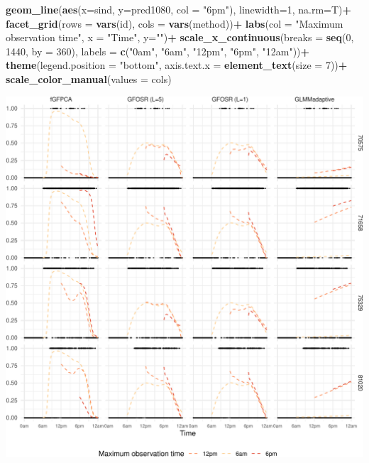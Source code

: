 \documentclass[
]{article}
\newenvironment{Shaded}{\begin{snugshade}}{\end{snugshade}}
\newcommand{\AttributeTok}[1]{\textcolor[rgb]{0.13,0.29,0.53}{#1}}
\newcommand{\DecValTok}[1]{\textcolor[rgb]{0.00,0.00,0.81}{#1}}
\newcommand{\FunctionTok}[1]{\textcolor[rgb]{0.13,0.29,0.53}{\textbf{#1}}}
\newcommand{\NormalTok}[1]{#1}
\newcommand{\SpecialCharTok}[1]{\textcolor[rgb]{0.81,0.36,0.00}{\textbf{#1}}}
\newcommand{\StringTok}[1]{\textcolor[rgb]{0.31,0.60,0.02}{#1}}
\begin{document}
\begin{Shaded}
\begin{Highlighting}[]
  \FunctionTok{geom\_line}\NormalTok{(}\FunctionTok{aes}\NormalTok{(}\AttributeTok{x=}\NormalTok{sind, }\AttributeTok{y=}\NormalTok{pred1080, }\AttributeTok{col =} \StringTok{"6pm"}\NormalTok{), }\AttributeTok{linewidth=}\DecValTok{1}\NormalTok{, }\AttributeTok{na.rm=}\NormalTok{T)}\SpecialCharTok{+}
  \FunctionTok{facet\_grid}\NormalTok{(}\AttributeTok{rows =} \FunctionTok{vars}\NormalTok{(id), }\AttributeTok{cols =} \FunctionTok{vars}\NormalTok{(method))}\SpecialCharTok{+}
  \FunctionTok{labs}\NormalTok{(}\AttributeTok{col =} \StringTok{"Maximum observation time"}\NormalTok{, }\AttributeTok{x =} \StringTok{"Time"}\NormalTok{, }\AttributeTok{y=}\StringTok{""}\NormalTok{)}\SpecialCharTok{+}
  \FunctionTok{scale\_x\_continuous}\NormalTok{(}\AttributeTok{breaks =} \FunctionTok{seq}\NormalTok{(}\DecValTok{0}\NormalTok{, }\DecValTok{1440}\NormalTok{, }\AttributeTok{by =} \DecValTok{360}\NormalTok{),}
                     \AttributeTok{labels =} \FunctionTok{c}\NormalTok{(}\StringTok{"0am"}\NormalTok{, }\StringTok{"6am"}\NormalTok{, }\StringTok{"12pm"}\NormalTok{, }\StringTok{"6pm"}\NormalTok{, }\StringTok{"12am"}\NormalTok{))}\SpecialCharTok{+}
  \FunctionTok{theme}\NormalTok{(}\AttributeTok{legend.position =} \StringTok{"bottom"}\NormalTok{, }\AttributeTok{axis.text.x =} \FunctionTok{element\_text}\NormalTok{(}\AttributeTok{size =} \DecValTok{7}\NormalTok{))}\SpecialCharTok{+}
  \FunctionTok{scale\_color\_manual}\NormalTok{(}\AttributeTok{values =}\NormalTok{ cols)}
\end{Highlighting}
\end{Shaded}

\includegraphics{manuscript_files/figure-latex/fig_appl-1.pdf}
\end{document}
